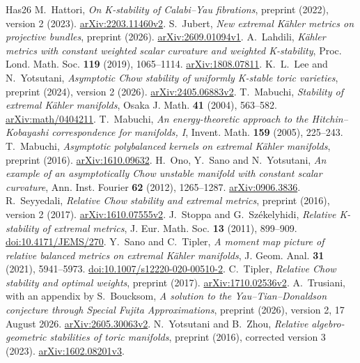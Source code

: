 \documentclass[12pt]{amsart}
\theoremstyle{definition}
\theoremstyle{remark}
\numberwithin{equation}{section}
\begin{document}
\begin{thebibliography}{Has26}
M.~Hattori,
\emph{On K-stability of Calabi--Yau fibrations},
preprint (2022), version 2 (2023).
\href{https://arxiv.org/abs/2203.11460v2}{arXiv:2203.11460v2}.
S.~Jubert,
\emph{New extremal Kähler metrics on projective bundles},
preprint (2026).
\href{https://arxiv.org/abs/2609.01094v1}{arXiv:2609.01094v1}.
A.~Lahdili,
\emph{Kähler metrics with constant weighted scalar curvature and weighted K-stability},
Proc. Lond. Math. Soc. \textbf{119} (2019), 1065--1114.
\href{https://arxiv.org/abs/1808.07811}{arXiv:1808.07811}.
K.~L.~Lee and N.~Yotsutani,
\emph{Asymptotic Chow stability of uniformly K-stable toric varieties},
preprint (2024), version 2 (2026).
\href{https://arxiv.org/abs/2405.06883v2}{arXiv:2405.06883v2}.
T.~Mabuchi,
\emph{Stability of extremal Kähler manifolds},
Osaka J. Math. \textbf{41} (2004), 563--582.
\href{https://arxiv.org/abs/math/0404211}{arXiv:math/0404211}.
T.~Mabuchi,
\emph{An energy-theoretic approach to the Hitchin--Kobayashi correspondence for manifolds, I},
Invent. Math. \textbf{159} (2005), 225--243.
T.~Mabuchi,
\emph{Asymptotic polybalanced kernels on extremal Kähler manifolds},
preprint (2016).
\href{https://arxiv.org/abs/1610.09632}{arXiv:1610.09632}.
H.~Ono, Y.~Sano and N.~Yotsutani,
\emph{An example of an asymptotically Chow unstable manifold with constant scalar curvature},
Ann. Inst. Fourier \textbf{62} (2012), 1265--1287.
\href{https://arxiv.org/abs/0906.3836}{arXiv:0906.3836}.
R.~Seyyedali,
\emph{Relative Chow stability and extremal metrics},
preprint (2016), version 2 (2017).
\href{https://arxiv.org/abs/1610.07555v2}{arXiv:1610.07555v2}.
J.~Stoppa and G.~Székelyhidi,
\emph{Relative K-stability of extremal metrics},
J. Eur. Math. Soc. \textbf{13} (2011), 899--909.
\href{https://doi.org/10.4171/JEMS/270}{doi:10.4171/JEMS/270}.
Y.~Sano and C.~Tipler,
\emph{A moment map picture of relative balanced metrics on extremal Kähler manifolds},
J. Geom. Anal. \textbf{31} (2021), 5941--5973.
\href{https://doi.org/10.1007/s12220-020-00510-2}{doi:10.1007/s12220-020-00510-2}.
C.~Tipler,
\emph{Relative Chow stability and optimal weights},
preprint (2017).
\href{https://arxiv.org/abs/1710.02536v2}{arXiv:1710.02536v2}.
A.~Trusiani, with an appendix by S.~Boucksom,
\emph{A solution to the Yau--Tian--Donaldson conjecture through Special Fujita Approximations},
preprint (2026), version 2, 17 August 2026.
\href{https://arxiv.org/abs/2605.30063v2}{arXiv:2605.30063v2}.
N.~Yotsutani and B.~Zhou,
\emph{Relative algebro-geometric stabilities of toric manifolds},
preprint (2016), corrected version 3 (2023).
\href{https://arxiv.org/abs/1602.08201v3}{arXiv:1602.08201v3}.
\end{thebibliography}
\end{document}
